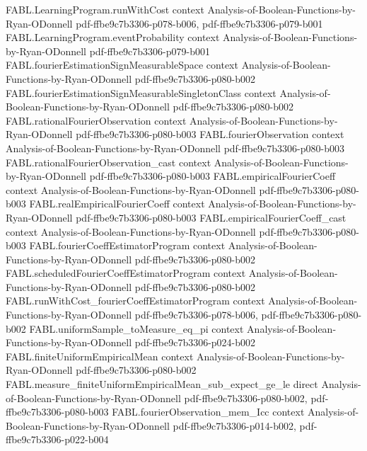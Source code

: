 \begin{theorem}
\proofstep
  {FABL.LearningProgram.runWithCost}
  {context}
  {Analysis-of-Boolean-Functions-by-Ryan-ODonnell}
  {pdf-ffbe9c7b3306-p078-b006,
    pdf-ffbe9c7b3306-p079-b001}
\proofstep
  {FABL.LearningProgram.eventProbability}
  {context}
  {Analysis-of-Boolean-Functions-by-Ryan-ODonnell}
  {pdf-ffbe9c7b3306-p079-b001}
\proofstep
  {FABL.fourierEstimationSignMeasurableSpace}
  {context}
  {Analysis-of-Boolean-Functions-by-Ryan-ODonnell}
  {pdf-ffbe9c7b3306-p080-b002}
\proofstep
  {FABL.fourierEstimationSignMeasurableSingletonClass}
  {context}
  {Analysis-of-Boolean-Functions-by-Ryan-ODonnell}
  {pdf-ffbe9c7b3306-p080-b002}
\proofstep
  {FABL.rationalFourierObservation}
  {context}
  {Analysis-of-Boolean-Functions-by-Ryan-ODonnell}
  {pdf-ffbe9c7b3306-p080-b003}
\proofstep
  {FABL.fourierObservation}
  {context}
  {Analysis-of-Boolean-Functions-by-Ryan-ODonnell}
  {pdf-ffbe9c7b3306-p080-b003}
\proofstep
  {FABL.rationalFourierObservation_cast}
  {context}
  {Analysis-of-Boolean-Functions-by-Ryan-ODonnell}
  {pdf-ffbe9c7b3306-p080-b003}
\proofstep
  {FABL.empiricalFourierCoeff}
  {context}
  {Analysis-of-Boolean-Functions-by-Ryan-ODonnell}
  {pdf-ffbe9c7b3306-p080-b003}
\proofstep
  {FABL.realEmpiricalFourierCoeff}
  {context}
  {Analysis-of-Boolean-Functions-by-Ryan-ODonnell}
  {pdf-ffbe9c7b3306-p080-b003}
\proofstep
  {FABL.empiricalFourierCoeff_cast}
  {context}
  {Analysis-of-Boolean-Functions-by-Ryan-ODonnell}
  {pdf-ffbe9c7b3306-p080-b003}
\proofstep
  {FABL.fourierCoeffEstimatorProgram}
  {context}
  {Analysis-of-Boolean-Functions-by-Ryan-ODonnell}
  {pdf-ffbe9c7b3306-p080-b002}
\proofstep
  {FABL.scheduledFourierCoeffEstimatorProgram}
  {context}
  {Analysis-of-Boolean-Functions-by-Ryan-ODonnell}
  {pdf-ffbe9c7b3306-p080-b002}
\proofstep
  {FABL.runWithCost_fourierCoeffEstimatorProgram}
  {context}
  {Analysis-of-Boolean-Functions-by-Ryan-ODonnell}
  {pdf-ffbe9c7b3306-p078-b006,
    pdf-ffbe9c7b3306-p080-b002}
\proofstep
  {FABL.uniformSample_toMeasure_eq_pi}
  {context}
  {Analysis-of-Boolean-Functions-by-Ryan-ODonnell}
  {pdf-ffbe9c7b3306-p024-b002}
\proofstep
  {FABL.finiteUniformEmpiricalMean}
  {context}
  {Analysis-of-Boolean-Functions-by-Ryan-ODonnell}
  {pdf-ffbe9c7b3306-p080-b002}
\proofstep
  {FABL.measure_finiteUniformEmpiricalMean_sub_expect_ge_le}
  {direct}
  {Analysis-of-Boolean-Functions-by-Ryan-ODonnell}
  {pdf-ffbe9c7b3306-p080-b002,
    pdf-ffbe9c7b3306-p080-b003}
\proofstep
  {FABL.fourierObservation_mem_Icc}
  {context}
  {Analysis-of-Boolean-Functions-by-Ryan-ODonnell}
  {pdf-ffbe9c7b3306-p014-b002,
    pdf-ffbe9c7b3306-p022-b004}

\end{theorem}
